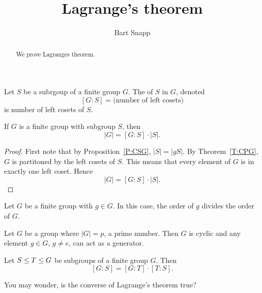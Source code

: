 \documentclass{ximera}
\author{Bart Snapp}
\title{Lagrange's theorem}
\begin{document}
\begin{abstract}
  We prove Lagranges theorem.
\end{abstract}
\maketitle

\begin{definition}
  Let $S$ be a subrgoup of a finite group $G$. The  of $S$ in $G$, denoted
  \[
  [G:S] = \text{(number of left cosets)}
  \]
  is number of left cosets of $S$.
\end{definition}



\begin{theorem}[Lagrange]
  If $G$ is a finite group with subgroup $S$, then 
  \[
  |G| = [G:S]\cdot |S|.
  \]
  \begin{proof}
    First note that by Proposition~\ref{P:CSG}, $|S| = |gS|$. By
    Theorem~\ref{T:CPG}, $G$ is partitoned by the left cosets of
    $S$. This means that every element of $G$ is in exactly one left
    coset. Hence
    \[
    |G| = [G:S]\cdot |S|.
    \]
  \end{proof}
\end{theorem}

\begin{corollary}
  Let $G$ be a finite group with $g\in G$. In this case, the order of
  $g$ divides the order of $G$.
\end{corollary}

\begin{corollary}
  Let $G$ be a group where $|G|= p$, a prime number. Then $G$ is
  cyclic and any element $g\in G$, $g\ne e$, can act as a generator.
\end{corollary}

\begin{corollary}
  Let $S \leq T \leq G$ be subgroups of a finite group
  $G$. Then
  \[
  [G:S] = [G:T]\cdot [T:S].
  \]
\end{corollary}

You may wonder, is the converse of Lagrange's theorem true?
\end{document}
